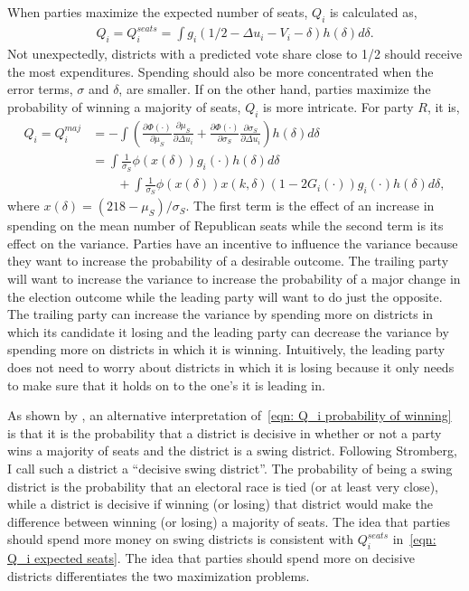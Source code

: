 \documentclass[12pt,final,fleqn]{article}
\theoremstyle{plain}
\begin{document}
When parties maximize the expected number of seats, $Q_i$ is calculated as, 
\begin{align} \label{eqn: Q_i expected seats}
Q_i = Q_i^{seats} = \int  g_i(1/2 - \Delta u_i - V_i - \delta) h(\delta) d\delta.
\end{align}
Not unexpectedly, districts with a predicted vote share close to 1/2 should receive the most expenditures. Spending should also be more concentrated when the error terms, $\sigma$ and $\delta$, are smaller. If on the other hand, parties maximize the probability of winning a majority of seats, $Q_i$ is more intricate. For party $R$, it is,
\begin{align} \label{eqn: Q_i probability of winning}
Q_i  = Q_i^{maj} &= - \int \left(\frac{\partial \Phi(\cdot)}{\partial \mu_S}\frac{\partial \mu_S}{\partial \Delta u_i}+\frac{\partial \Phi(\cdot)}{\partial \sigma_S}\frac{\partial \sigma_S}{\partial \Delta u_i}\right)h(\delta)d\delta  \\
& = \int \frac{1}{\sigma_S}\phi(x(\delta))g_i(\cdot)h(\delta)d\delta \nonumber \\
 &\qquad + \int \frac{1}{\sigma_S}\phi(x(\delta))x(k, \delta)\left(1-2G_i(\cdot)\right) g_i(\cdot)h(\delta)d\delta,
\end{align}
where $x(\delta) = \left(218 - \mu_S\right)/\sigma_S$. The first term is the effect of an increase in spending on the mean number of Republican seats while the second term is its effect on the variance. Parties have an incentive to influence the variance because they want to increase the probability of a desirable outcome. The trailing party will want to increase the variance to increase the probability of a major change in the election outcome while the leading party will want to do just the opposite. The trailing party can increase the variance by spending more on districts in which its candidate it losing and the leading party can decrease the variance by spending more on districts in which it is winning. Intuitively, the leading party does not need to worry about districts in which it is losing because it only needs to make sure that it holds on to the one's it is leading in.

As shown by \citet{stromberg2008electoral}, an alternative interpretation of~\autoref{eqn: Q_i probability of winning} is that it is the probability that a district is decisive in whether or not a party wins a majority of seats and the district is a swing district. Following Stromberg, I call such a district a ``decisive swing district''. The probability of being a swing district is the probability that an electoral race is tied (or at least very close), while a district is decisive if winning (or losing) that district would make the difference between winning (or losing) a majority of seats. The idea that parties should spend more money on swing districts is consistent with $Q_i^{seats}$ in~\autoref{eqn: Q_i expected seats}. The idea that parties should spend more on decisive districts differentiates the two maximization problems.
\end{document}
